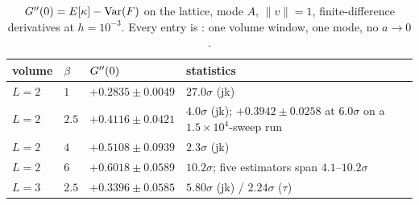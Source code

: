 \begin{table}[h]
\centering\footnotesize
\setlength{\tabcolsep}{6pt}
\renewcommand{\arraystretch}{1.1}
\begin{tabular}{@{}llll@{}}
\toprule
volume & $\beta$ & $G''(0)$ & statistics\\
\midrule
$L=2$ & $1$   & $+0.2835\pm0.0049$ & $27.0\sigma$ (jk)\\
$L=2$ & $2.5$ & $+0.4116\pm0.0421$ & $4.0\sigma$ (jk); $+0.3942\pm0.0258$ at $6.0\sigma$ on a
$1.5\times10^{4}$-sweep run\\
$L=2$ & $4$   & $+0.5108\pm0.0939$ & $2.3\sigma$ (jk)\\
$L=2$ & $6$   & $+0.6018\pm0.0589$ & $10.2\sigma$; five estimators span $4.1$--$10.2\sigma$\\
$L=3$ & $2.5$ & $+0.3396\pm0.0585$ & $5.80\sigma$ (jk) / $2.24\sigma$ ($\tau$)\\
\bottomrule
\end{tabular}
\caption{$G''(0)=E[\kappa]-\operatorname{Var}(F)$ on the lattice, mode $A$, $\|v\|=1$, finite-difference derivatives at
$h=10^{-3}$. Every entry is \LE: one volume window, one mode, no $a\to0$.}
\label{tab:ledger}
\end{table}

